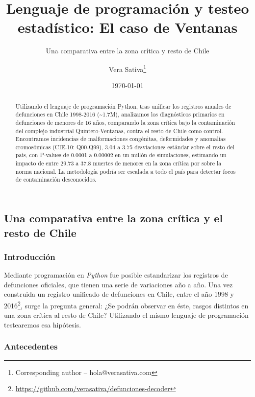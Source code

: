 \documentclass[]{article}
\title{Lenguaje de programación y testeo estadístico: El caso de Ventanas}
\subtitle{Una comparativa entre la zona crítica y resto de Chile}
\author{Vera Sativa\footnote{Corresponding author – hola@verasativa.com}}
\date{\today}
\DeclareRobustCommand{\href}[2]{#2\footnote{\url{#1}}}
\begin{document}
\maketitle
\begin{abstract}
Utilizando el lenguaje de programación Python, tras unificar los
registros anuales de defunciones en Chile 1998-2016
(\textasciitilde{}1.7M), analizamos los diagnósticos primarios en
defunciones de menores de 16 años, comparando la zona crítica bajo la
contaminación del complejo industrial Quintero-Ventanas, contra el resto
de Chile como control. Encontramos incidencias de malformaciones
congénitas, deformidades y anomalías cromosómicas (CIE-10: Q00-Q99),
3.04 a 3.75 desviaciones estándar sobre el resto del país, con P-values
de 0.0001 a 0.00002 en un millón de simulaciones, estimando un impacto
de entre 29.73 a 37.8 muertes de menores en la zona crítica por sobre la
norma nacional. La metodología podría ser escalada a todo el país para
detectar focos de contaminación desconocidos.
\end{abstract}

\hypertarget{una-comparativa-entre-la-zona-cruxedtica-y-el-resto-de-chile}{%
\subsection{Una comparativa entre la zona crítica y el resto de
Chile}\label{una-comparativa-entre-la-zona-cruxedtica-y-el-resto-de-chile}}

\hypertarget{introducciuxf3n}{%
\subsubsection{Introducción}\label{introducciuxf3n}}

Mediante programación en \emph{Python} fue posible estandarizar los
registros de defunciones oficiales, que tienen una serie de variaciones
año a año. Una vez construida un
\href{https://github.com/verasativa/defunciones-decoder}{registro
unificado de defunciones en Chile, entre el año 1998 y 2016}, surge la
pregunta general: ¿Se podrán observar en éste, rasgos distintos en una
zona crítica al resto de Chile? Utilizando el mismo lenguaje de
programación testearemos esa hipótesis.

\hypertarget{antecedentes}{%
\subsubsection{Antecedentes}\label{antecedentes}}
\end{document}
